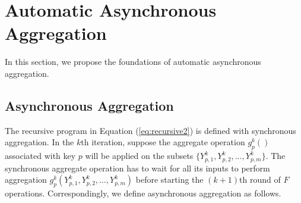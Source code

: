 \section{Automatic Asynchronous Aggregation}
\label{sec:async}
In this section, we propose the foundations of automatic asynchronous aggregation.

\subsection{Asynchronous Aggregation}
\label{sec:async:async}

The recursive program in Equation (\ref{eq:recursive2}) is defined with synchronous aggregation. In the $k$th iteration, suppose the aggregate operation $g_{p}^k()$ associated with key $p$ will be applied on the subsets $\{Y_{p,1}^k,Y_{p,2}^k,\ldots,Y_{p,m}^k\}$. The synchronous aggregate operation has to wait for all its inputs to perform aggregation $g_{p}^k(Y_{p,1}^k,Y_{p,2}^k,\ldots,Y_{p,m}^k)$ before starting the $(k+1)$th round of $F$ operations. Correspondingly, we define asynchronous aggregation as follows.
 



